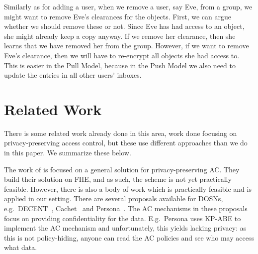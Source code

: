 Similarly as for adding a user, when we remove a user, say Eve, from a group, 
we might want to remove Eve's clearances for the objects.
First, we can argue whether we should remove these or not.
Since Eve has had access to an object, she might already keep a copy anyway.
If we remove her clearance, then she learns that we have removed her from the 
group.
However, if we want to remove Eve's clearance, then we will have to re-encrypt 
all objects she had access to.
This is easier in the Pull Model, because in the Push Model we also need to 
update the entries in all other users' inboxes.

%


\section<article>{Related Work}\label{RelatedWork}

There is some related work already done in this area, work done focusing on 
privacy-preserving access control, but these use different approaches than we 
do in this paper.
We summarize these below.

The work of \citet{TowardsPPACwHPHCHD} is focused on a general solution for 
privacy-preserving \ac{AC}.
They build their solution on \ac{FHE}, and as such, the scheme is not yet 
practically feasible.
However, there is also a body of work which is practically feasible and is 
applied in our setting.
There are several proposals available for \acp{DOSN}, e.g.\ 
DECENT~\cite{DECENT}, Cachet~\cite{Cachet} and Persona~\cite{Persona}.
The \ac{AC} mechanisms in these proposals focus on providing confidentiality 
for the data.
E.g.\ Persona uses \ac{KP-ABE} to implement the \ac{AC} mechanism and
unfortunately, this yields lacking privacy: as this is not policy-hiding, 
anyone can read the \ac{AC} policies and see who may access what data.

